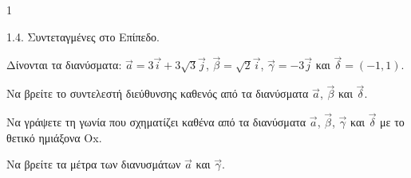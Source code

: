 \begin{ylh}{1}
    \item 1.4. Συντεταγμένες στο Επίπεδο.
\end{ylh}
Δίνονται τα διανύσματα: $\vec{a} = 3\vec{i} + 3\sqrt{3}\vec{j}$, $\vec{β} = \sqrt{2}\vec{i}$, $\vec{γ} = -3\vec{j}$ και $\vec{δ} = (-1, 1)$.
\begin{alist}
\item Να βρείτε το συντελεστή διεύθυνσης καθενός από τα διανύσματα $\vec{a}$, $\vec{β}$ και $\vec{δ}$. 
\item Να γράψετε τη γωνία που σχηματίζει καθένα από τα διανύσματα $\vec{a}$, $\vec{β}$, $\vec{γ}$ και $\vec{δ}$ με το θετικό ημιάξονα Ox. 
\item Να βρείτε τα μέτρα των διανυσμάτων $\vec{a}$ και $\vec{γ}$. 
\end{alist}